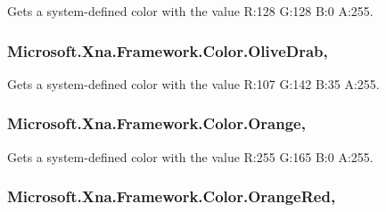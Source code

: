 Gets a system-\/defined color with the value R\+:128 G\+:128 B\+:0 A\+:255.

\hypertarget{struct_microsoft_1_1_xna_1_1_framework_1_1_color_aed90c62ffd1b0473d880ef8859e9fd7b}{}
\subsubsection[{Olive\+Drab}]{ Microsoft.\+Xna.\+Framework.\+Color.\+Olive\+Drab\hspace{0.3cm}{\ttfamily [static]}, {\ttfamily [get]}}\label{struct_microsoft_1_1_xna_1_1_framework_1_1_color_aed90c62ffd1b0473d880ef8859e9fd7b}


Gets a system-\/defined color with the value R\+:107 G\+:142 B\+:35 A\+:255.

\hypertarget{struct_microsoft_1_1_xna_1_1_framework_1_1_color_a891dbee2b9fed788066f447618cc55d5}{}
\subsubsection[{Orange}]{ Microsoft.\+Xna.\+Framework.\+Color.\+Orange\hspace{0.3cm}{\ttfamily [static]}, {\ttfamily [get]}}\label{struct_microsoft_1_1_xna_1_1_framework_1_1_color_a891dbee2b9fed788066f447618cc55d5}


Gets a system-\/defined color with the value R\+:255 G\+:165 B\+:0 A\+:255.

\hypertarget{struct_microsoft_1_1_xna_1_1_framework_1_1_color_af24e501281a78bef15f3d8348202735c}{}
\subsubsection[{Orange\+Red}]{ Microsoft.\+Xna.\+Framework.\+Color.\+Orange\+Red\hspace{0.3cm}{\ttfamily [static]}, {\ttfamily [get]}}\label{struct_microsoft_1_1_xna_1_1_framework_1_1_color_af24e501281a78bef15f3d8348202735c}


